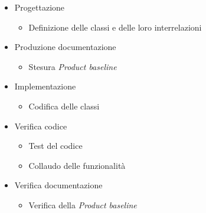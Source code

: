 \documentclass[../piano-di-progetto.tex]{subfiles}
\begin{document}
\begin{itemize}
  \item Progettazione
  \begin{itemize}
    \item Definizione delle classi e delle loro interrelazioni
  \end{itemize}
  \item Produzione documentazione
  \begin{itemize}
    \item Stesura \textit{Product baseline}
  \end{itemize}
  \item Implementazione
  \begin{itemize}
    \item Codifica delle classi
  \end{itemize}
  \item Verifica codice
  \begin{itemize}
    \item Test del codice
    \item Collaudo delle funzionalità
  \end{itemize}
  \item Verifica documentazione
  \begin{itemize}
    \item Verifica della \textit{Product baseline}
  \end{itemize}
\end{itemize}
\end{document}
